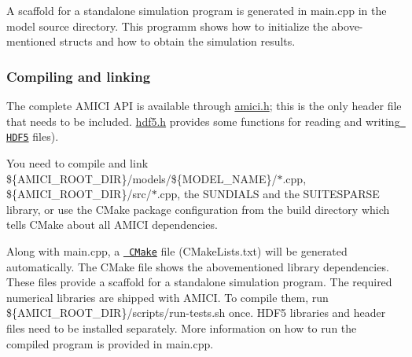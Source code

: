 A scaffold for a standalone simulation program is generated in {\ttfamily main.\+cpp} in the model source directory. This programm shows how to initialize the above-\/mentioned structs and how to obtain the simulation results.

\subsubsection*{Compiling and linking}

The complete A\+M\+I\+CI A\+PI is available through {\ttfamily \mbox{\hyperlink{amici_8h_source}{amici.\+h}}}; this is the only header file that needs to be included. {\ttfamily \mbox{\hyperlink{hdf5_8h_source}{hdf5.\+h}}} provides some functions for reading and writing \href{https://support.hdfgroup.org/}{\texttt{ H\+D\+F5}} files).

You need to compile and link {\ttfamily \$\{A\+M\+I\+C\+I\+\_\+\+R\+O\+O\+T\+\_\+\+D\+IR\}/models/\$\{M\+O\+D\+E\+L\+\_\+\+N\+A\+ME\}/$\ast$.cpp}, {\ttfamily \$\{A\+M\+I\+C\+I\+\_\+\+R\+O\+O\+T\+\_\+\+D\+IR\}/src/$\ast$.cpp}, the S\+U\+N\+D\+I\+A\+LS and the S\+U\+I\+T\+E\+S\+P\+A\+R\+SE library, or use the C\+Make package configuration from the build directory which tells C\+Make about all A\+M\+I\+CI dependencies.

Along with {\ttfamily main.\+cpp}, a \href{https://cmake.org/}{\texttt{ C\+Make}} file ({\ttfamily C\+Make\+Lists.\+txt}) will be generated automatically. The C\+Make file shows the abovementioned library dependencies. These files provide a scaffold for a standalone simulation program. The required numerical libraries are shipped with A\+M\+I\+CI. To compile them, run {\ttfamily \$\{A\+M\+I\+C\+I\+\_\+\+R\+O\+O\+T\+\_\+\+D\+IR\}/scripts/run-\/tests.sh} once. H\+D\+F5 libraries and header files need to be installed separately. More information on how to run the compiled program is provided in {\ttfamily main.\+cpp}. 